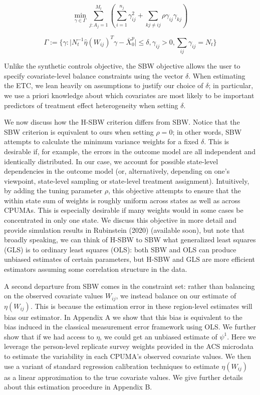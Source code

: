 \documentclass[12pt]{article}
\begin{document}
$$
\min_{\gamma \in \Gamma} \sum_{j: A_j = 1}^{M_t}(\sum_{i = 1}^{n_j} \gamma_{ij}^2 + \sum_{kj \ne ij}\rho \gamma_{ij}\gamma_{kj})
$$

$$
\Gamma := \{\gamma: \mid N_t^{-1}\hat{\eta}(W_{ij})^T\gamma - \bar{X}_0^p \mid \le \delta, \gamma_{ij} > 0, \sum_{ij}\gamma_{ij} = N_t\}
$$

Unlike the synthetic controls objective, the SBW objective allows the user to specify covariate-level balance constraints using the vector $\delta$. When estimating the ETC, we lean heavily on assumptions to justify our choice of $\delta$; in particular, we use a priori knowledge about which covariates are most likely to be important predictors of treatment effect heterogeneity when setting $\delta$. 

We now discuss how the H-SBW criterion differs from SBW. Notice that the SBW criterion is equivalent to ours when setting $\rho = 0$; in other words, SBW attempts to calculate the minimum variance weights for a fixed $\delta$. This is desirable if, for example, the errors in the outcome model are all independent and identically distributed. In our case, we account for possible state-level dependencies in the outcome model (or, alternatively, depending on one's viewpoint, state-level sampling or state-level treatment assignment). Intuitively, by adding the tuning parameter $\rho$, this objective attempts to ensure that the within state sum of weights is roughly uniform across states as well as across CPUMAs. This is especially desirable if many weights would in some cases be concentrated in only one state. We discuss this objective in more detail and provide simulation results in Rubinstein (2020) (available soon), but note that broadly speaking, we can think of H-SBW to SBW what generalized least squares (GLS) is to ordinary least squares (OLS): both SBW and OLS can produce unbiased estimates of certain parameters, but H-SBW and GLS are more efficient estimators assuming some correlation structure in the data.

A second departure from SBW comes in the constraint set: rather than balancing on the observed covariate values $W_{ij}$, we instead balance on our estimate of $\eta(W_{ij})$. This is because the estimation error in these region-level estimates will bias our estimator. In Appendix A we show that this bias is equivalent to the bias induced in the classical measurement error framework using OLS. We further show that if we had access to $\eta$, we could get an unbiased estimate of $\psi^1$. Here we leverage the person-level replicate survey weights provided in the ACS microdata to estimate the variability in each CPUMA's observed covariate values. We then use a variant of standard regression calibration techniques to estimate $\eta(W_{ij})$ as a linear approximation to the true covariate values. We give further details about this estimation procedure in Appendix B.
\end{document}
